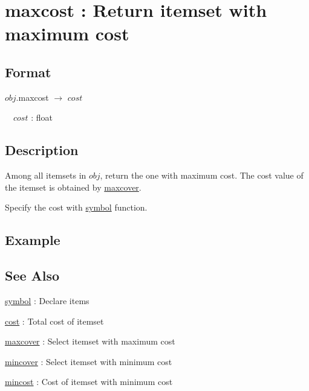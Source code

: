 
\section{maxcost : Return itemset with maximum cost\label{sect:maxcost}}
\subsection*{Format}
$obj$.maxcost $\rightarrow$ $cost$

~~$cost$ : float

\subsection*{Description}
Among all itemsets in $obj$, return the one with maximum cost.  
The cost value of the itemset is obtained by \hyperref[sect:maxcover]{maxcover}. 

Specify the cost with \hyperref[sect:symbol]{symbol} function.

\subsection*{Example}


\subsection*{See Also}
\hyperref[sect:symbol]{symbol} : Declare items

\hyperref[sect:cost]{cost} : Total cost of itemset 

\hyperref[sect:maxcover]{maxcover} : Select itemset with maximum cost 

\hyperref[sect:mincover]{mincover} : Select itemset with minimum cost

\hyperref[sect:mincost]{mincost} : Cost of itemset with minimum cost


